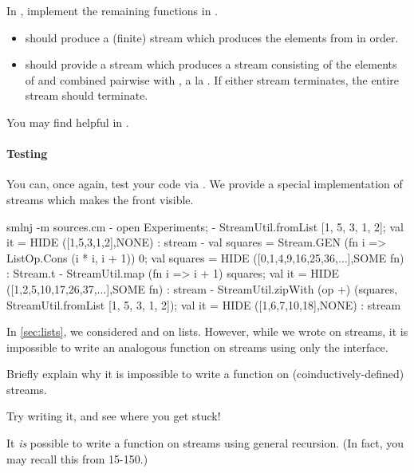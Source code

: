 \documentclass[11pt]{article}
\begin{document}
\begin{task}{10}
  In , implement the remaining functions in .
  \begin{itemize}
    \item
       should produce a (finite) stream which produces the elements from  in order.

    \item
       should provide a stream which produces a stream consisting of the elements of  and  combined pairwise with , a la .
      If either stream terminates, the entire stream should terminate.
  \end{itemize}
\end{task}
\begin{hint}
  You may find  helpful in .
\end{hint}

\paragraph{Testing}
You can, once again, test your code via .
We provide a special implementation of streams which makes the front visible.
\begin{codeblock}
  smlnj -m sources.cm
  - open Experiments;
  - StreamUtil.fromList [1, 5, 3, 1, 2];
  val it = HIDE ([1,5,3,1,2],NONE) : stream
  - val squares = Stream.GEN (fn i => ListOp.Cons (i * i, i + 1)) 0;
  val squares = HIDE ([0,1,4,9,16,25,36,...],SOME fn) : Stream.t
  - StreamUtil.map (fn i => i + 1) squares;
  val it = HIDE ([1,2,5,10,17,26,37,...],SOME fn) : stream
  - StreamUtil.zipWith (op +) (squares, StreamUtil.fromList [1, 5, 3, 1, 2]);
  val it = HIDE ([1,6,7,10,18],NONE) : stream
\end{codeblock}

In \cref{sec:lists}, we considered  and  on lists.
However, while we wrote  on streams, it is impossible to write an analogous  function on streams using only the  interface.

\begin{task}{5}
  Briefly explain why it is impossible to write a  function on (coinductively-defined) streams.
\end{task}
\begin{hint}
  Try writing it, and see where you get stuck!
\end{hint}
\begin{remark}
  It \emph{is} possible to write a  function on streams using general recursion.
  (In fact, you may recall this from 15-150.)
\end{remark}
\end{document}
